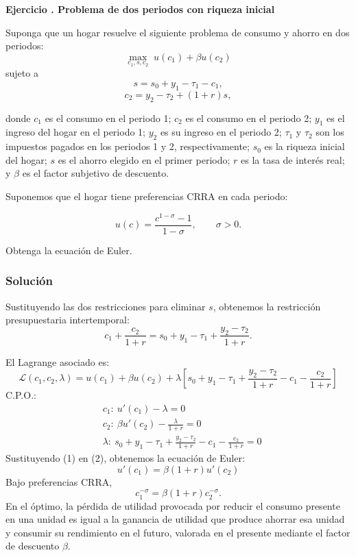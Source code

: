 \documentclass[11pt]{article}
\let\enumerateoriginal\enumerate
\let\endenumerateoriginal\endenumerate
\renewenvironment{enumerate}{%
  \enumerateoriginal
  \setlength{\itemsep}{0.5em}%
  \setlength{\parsep}{0pt}%
  \setlength{\topsep}{0.4em}%
}{\endenumerateoriginal}
\newcounter{problema}
\newenvironment{problema}[1]{%
  \par
  \refstepcounter{problema}%
  \addvspace{0.9em}%
  \noindent\textbf{Ejercicio \theproblema. #1}
  \par\nobreak\smallskip
}{\par}
\begin{document}
\begin{problema}{Problema de dos periodos con riqueza inicial}
\label{Ej:P2P}
Suponga que un hogar resuelve el siguiente problema de consumo y ahorro en dos periodos:
\[
    \max_{c_1,s,c_2}\; u(c_1)+\beta u(c_2)
\]
sujeto a
\[
    s=s_0+y_1-\tau_1-c_1,
\]
\[
    c_2=y_2-\tau_2+(1+r)s,
\]

donde $c_1$ es el consumo en el periodo 1; $c_2$ es el consumo en el periodo 2; $y_1$ es el ingreso del hogar en el periodo 1; $y_2$ es su ingreso en el periodo 2; $\tau_1$ y $\tau_2$ son los impuestos pagados en los periodos 1 y 2, respectivamente; $s_0$ es la riqueza inicial del hogar; $s$ es el ahorro elegido en el primer periodo; $r$ es la tasa de interés real; y $\beta$ es el factor subjetivo de descuento.

Suponemos que el hogar tiene preferencias CRRA en cada periodo: 

\[
    u(c)=\frac{c^{1-\sigma}-1}{1-\sigma}, \qquad \sigma >0.
\]

\begin{enumerate}
    \item Obtenga la ecuación de Euler.

    \subsubsection*{Solución}

Sustituyendo las dos restricciones para eliminar $s$, obtenemos la restricción presupuestaria intertemporal:
\[
  c_1+\frac{c_2}{1+r} = s_0+y_1-\tau_1+\frac{y_2-\tau_2}{1+r}.
\]

El Lagrange asociado es:
$$
\mathcal{L}(c_1, c_2, \lambda) = u(c_1) + \beta u(c_2) + \lambda\left[s_0+ y_1 - \tau_1+\frac{y_2-\tau_2}{1+r} - c_1 - \frac{c_2}{1+r}\right]
$$
C.P.O.:
\begin{align*}
  &c_1 : \ u'(c_1) - \lambda = 0 \tag{1} \\
  &c_2 : \ \beta u'(c_2) - \frac{\lambda}{1 + r} = 0 \tag{2} \\
  &\lambda : \ s_0+y_1-\tau_1+\frac{y_2-\tau_2}{1+r} -c_1-\frac{c_2}{1+r} = 0 \tag{3}
\end{align*}
Sustituyendo (1) en (2), obtenemos la ecuación de Euler:
$$
u'(c_1) = \beta(1 + r)u'(c_2)
$$
Bajo preferencias CRRA,
\[
  \boxed{
  c_1^{-\sigma}
  =
  \beta(1+r)c_2^{-\sigma}
  }.
\]
En el óptimo, la pérdida de utilidad provocada por reducir el consumo presente en una unidad es igual a la ganancia de utilidad que produce ahorrar esa unidad y consumir su rendimiento en el futuro, valorada en el presente mediante el factor de descuento \(\beta\).


\end{enumerate}
\end{problema}
\end{document}
